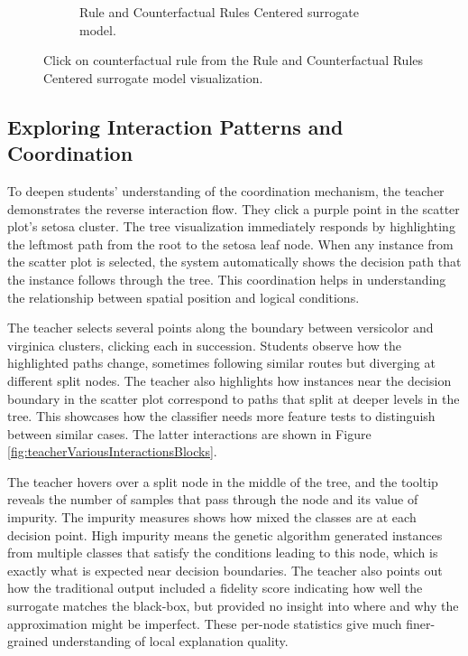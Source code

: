 \begin{figure}[ht]
\begin{subfigure}[c]{0.48\textwidth}
        \caption{Rule and Counterfactual Rules Centered surrogate model.}
    \end{subfigure}
    \caption{Click on counterfactual rule from the Rule and Counterfactual Rules Centered surrogate model visualization.}
    \label{fig:teaching_blocks_click_alternative}
\end{figure}


\subsection{Exploring Interaction Patterns and Coordination}

To deepen students' understanding of the coordination mechanism, the teacher demonstrates the reverse interaction flow. They click a purple point in the scatter plot's setosa cluster. The tree visualization immediately responds by highlighting the leftmost path from the root to the setosa leaf node. When any instance from the scatter plot is selected, the system automatically shows the decision path that the instance follows through the tree. This coordination helps in understanding the relationship between spatial position and logical conditions.

The teacher selects several points along the boundary between versicolor and virginica clusters, clicking each in succession. Students observe how the highlighted paths change, sometimes following similar routes but diverging at different split nodes. The teacher also highlights how instances near the decision boundary in the scatter plot correspond to paths that split at deeper levels in the tree. This showcases how the classifier needs more feature tests to distinguish between similar cases. The latter interactions are shown in Figure \ref{fig:teacherVariousInteractionsBlocks}.

The teacher hovers over a split node in the middle of the tree, and the tooltip reveals the number of samples that pass through the node and its value of impurity. The impurity measures shows how mixed the classes are at each decision point. High impurity means the genetic algorithm generated instances from multiple classes that satisfy the conditions leading to this node, which is exactly what is expected near decision boundaries. The teacher also points out how the traditional output included a fidelity score indicating how well the surrogate matches the black-box, but provided no insight into where and why the approximation might be imperfect. These per-node statistics give much finer-grained understanding of local explanation quality.

